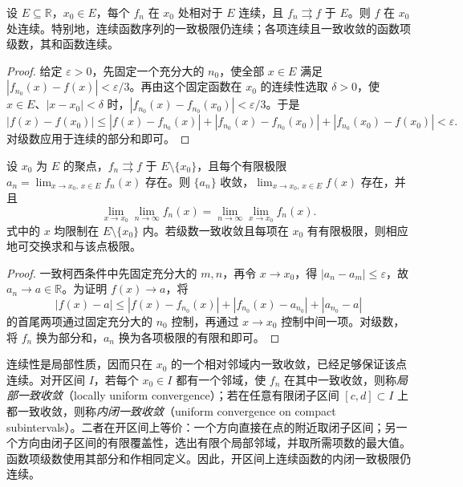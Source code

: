 \begin{theorem}[连续性与一致极限]
\label{thm:continuity-of-uniform-limit}
设 $E\subseteq\mathbb R$，$x_0\in E$，每个 $f_n$ 在 $x_0$ 处相对于 $E$ 连续，且 $f_n\rightrightarrows f$ 于 $E$。则 $f$ 在 $x_0$ 处连续。特别地，连续函数序列的一致极限仍连续；各项连续且一致收敛的函数项级数，其和函数连续。
\end{theorem}

\begin{proof}
给定 $\varepsilon>0$，先固定一个充分大的 $n_0$，使全部 $x\in E$ 满足 $|f_{n_0}(x)-f(x)|<\varepsilon/3$。再由这个固定函数在 $x_0$ 的连续性选取 $\delta>0$，使 $x\in E$、$|x-x_0|<\delta$ 时，$|f_{n_0}(x)-f_{n_0}(x_0)|<\varepsilon/3$。于是
\[
    |f(x)-f(x_0)|
    \leq |f(x)-f_{n_0}(x)|
       +|f_{n_0}(x)-f_{n_0}(x_0)|
       +|f_{n_0}(x_0)-f(x_0)|<\varepsilon.
\]
对级数应用于连续的部分和即可。
\end{proof}

\begin{theorem}[一致收敛下交换两次极限]
\label{thm:exchange-limits-under-uniform-convergence}
设 $x_0$ 为 $E$ 的聚点，$f_n\rightrightarrows f$ 于 $E\setminus\{x_0\}$，且每个有限极限 $a_n=\lim_{x\to x_0,\,x\in E}f_n(x)$ 存在。则 $\{a_n\}$ 收敛，$\lim_{x\to x_0,\,x\in E}f(x)$ 存在，并且
\begin{equation}
    \lim_{x\to x_0}\lim_{n\to\infty}f_n(x)
    =\lim_{n\to\infty}\lim_{x\to x_0}f_n(x).
    \label{eq:exchange-uniform-double-limits}
\end{equation}
式中的 $x$ 均限制在 $E\setminus\{x_0\}$ 内。若级数一致收敛且每项在 $x_0$ 有有限极限，则相应地可交换求和与该点极限。
\end{theorem}

\begin{proof}
一致柯西条件中先固定充分大的 $m,n$，再令 $x\to x_0$，得 $|a_n-a_m|\leq\varepsilon$，故 $a_n\to a\in\mathbb R$。为证明 $f(x)\to a$，将
\[
    |f(x)-a|\leq|f(x)-f_{n_0}(x)|
          +|f_{n_0}(x)-a_{n_0}|+|a_{n_0}-a|
\]
的首尾两项通过固定充分大的 $n_0$ 控制，再通过 $x\to x_0$ 控制中间一项。对级数，将 $f_n$ 换为部分和，$a_n$ 换为各项极限的有限和即可。
\end{proof}

连续性是局部性质，因而只在 $x_0$ 的一个相对邻域内一致收敛，已经足够保证该点连续。对开区间 $I$，若每个 $x_0\in I$ 都有一个邻域，使 $f_n$ 在其中一致收敛，则称\emph{局部一致收敛}（locally uniform convergence）；若在任意有限闭子区间 $[c,d]\subset I$ 上都一致收敛，则称\emph{内闭一致收敛}（uniform convergence on compact subintervals）。二者在开区间上等价：一个方向直接在点的附近取闭子区间；另一个方向由闭子区间的有限覆盖性，选出有限个局部邻域，并取所需项数的最大值。函数项级数使用其部分和作相同定义。因此，开区间上连续函数的内闭一致极限仍连续。

